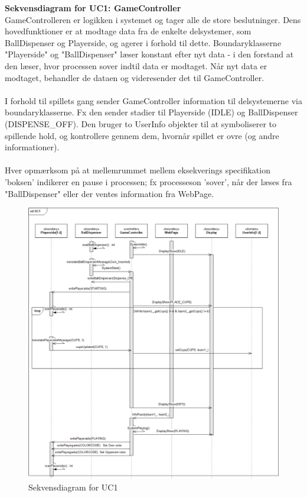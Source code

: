 \documentclass[Arkitektur/System_main.tex]{subfiles}
\begin{document}
\textbf{Sekvensdiagram for UC1: GameController}\\
GameControlleren er logikken i systemet og tager alle de store beslutninger. Dens hovedfunktioner er at modtage data fra de enkelte delsystemer, som BallDispenser og Playerside, og agerer i forhold til dette. Boundaryklasserne "Playerside" og "BallDispenser" læser konstant efter nyt data - i den forstand at den læser, hvor processen sover indtil data er modtaget. Når nyt data er modtaget, behandler de dataen og videresender det til GameController. \\\\
I forhold til spillets gang sender GameController information til delsystemerne via boundaryklasserne. Fx den sender stadier til Playerside (IDLE) og BallDispenser (DISPENSE\_OFF). Den bruger to UserInfo objekter til at symboliserer to spillende hold, og kontrollere gennem dem, hvornår spillet er ovre (og andre informationer). \\\\
Hver opmærksom på at mellemrummet mellem eksekverings specifikation 'boksen' indikerer en pause i processen; fx processeson 'sover', når der læses fra "BallDispenser" eller der ventes information fra WebPage. 
\begin{figure}[H]
    \centering
    \includegraphics[width=\textwidth]{Arkitektur/Softwarearkitektur/Applikationsmodel/RPi/graphics_RPi/UC1_SD.png}
    \caption{Sekvensdiagram for UC1}
    \label{fig:UC1_SD_RPi}
\end{figure}
\end{document}
